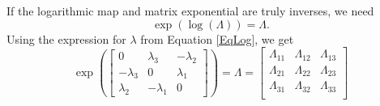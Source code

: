 \documentclass[10pt,letterpaper,oneside,notitlepage]{article}
\begin{document}
If the logarithmic map and matrix exponential are truly inverses, we need 
\begin{equation}
\exp(\log(\Lambda)) = \Lambda. 
\end{equation}
Using the expression for $\lambda$ from Equation \ref{EqLog}, we get
\begin{equation}
\label{EqExpMatrix}
	\exp\left(
 \begin{bmatrix}
		0          &  \lambda_3 & -\lambda_2 \\
		-\lambda_3 &  0         &  \lambda_1 \\	
		 \lambda_2 & -\lambda_1 &  0          
	\end{bmatrix}
\right)	= \Lambda =
 \begin{bmatrix}
  \Lambda_{11} & \Lambda_{12} & \Lambda_{13} \\
  \Lambda_{21} & \Lambda_{22} & \Lambda_{23} \\
  \Lambda_{31} & \Lambda_{32} & \Lambda_{33} \\
 \end{bmatrix}
\end{equation}
\end{document}
